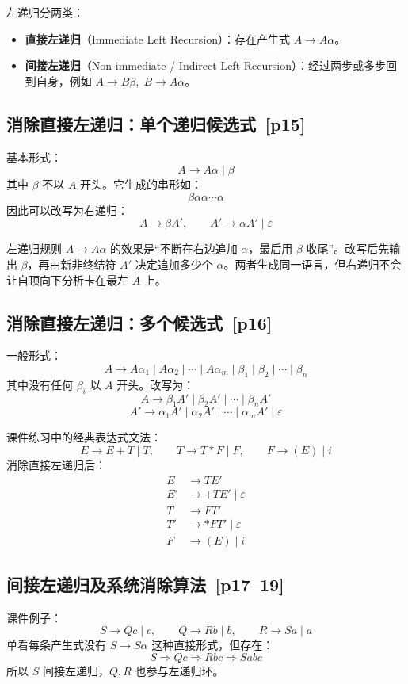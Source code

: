 \documentclass[UTF8,fontset=none,11pt]{ctexart}
\newenvironment{notebox}[1][]{%
  \par\medskip\noindent{\color{maincol}\rule{\linewidth}{1.1pt}}\par\nopagebreak
  \noindent{\bfseries\color{maincol}#1}\par\nopagebreak\smallskip}%
  {\par\nopagebreak\smallskip\noindent{\color{maincol}\rule{\linewidth}{0.4pt}}\par\medskip}
\newcommand{\pg}[1]{\texorpdfstring{{\small\color{graytext}\,[p#1]}}{ [p#1]}}
\newcommand{\term}[2]{\textbf{#1}（#2）}
\newcommand{\eps}{\varepsilon}
\begin{document}
左递归分两类：
\begin{itemize}
  \item \term{直接左递归}{Immediate Left Recursion}：存在产生式 \(A\to A\alpha\)。
  \item \term{间接左递归}{Non-immediate / Indirect Left Recursion}：经过两步或多步回到自身，例如 \(A\to B\beta,\;B\to A\alpha\)。
\end{itemize}

\subsection{消除直接左递归：单个递归候选式 \pg{15}}
基本形式：
\[
A\to A\alpha\mid\beta
\]
其中 \(\beta\) 不以 \(A\) 开头。它生成的串形如：
\[
\beta\alpha\alpha\cdots\alpha
\]
因此可以改写为右递归：
\[
A\to \beta A',\qquad A'\to \alpha A'\mid\eps
\]

\begin{notebox}[通俗理解]
左递归规则 \(A\to A\alpha\) 的效果是“不断在右边追加 \(\alpha\)，最后用 \(\beta\) 收尾”。改写后先输出 \(\beta\)，再由新非终结符 \(A'\) 决定追加多少个 \(\alpha\)。两者生成同一语言，但右递归不会让自顶向下分析卡在最左 \(A\) 上。
\end{notebox}

\subsection{消除直接左递归：多个候选式 \pg{16}}
一般形式：
\[
A\to A\alpha_1\mid A\alpha_2\mid\cdots\mid A\alpha_m
\mid \beta_1\mid\beta_2\mid\cdots\mid\beta_n
\]
其中没有任何 \(\beta_i\) 以 \(A\) 开头。改写为：
\[
A\to \beta_1A'\mid \beta_2A'\mid\cdots\mid\beta_nA'
\]
\[
A'\to \alpha_1A'\mid \alpha_2A'\mid\cdots\mid\alpha_mA'\mid\eps
\]

课件练习中的经典表达式文法：
\[
E\to E+T\mid T,\qquad T\to T*F\mid F,\qquad F\to(E)\mid i
\]
消除直接左递归后：
\[
\begin{aligned}
E&\to TE'\\
E'&\to +TE'\mid\eps\\
T&\to FT'\\
T'&\to *FT'\mid\eps\\
F&\to(E)\mid i
\end{aligned}
\]

\subsection{间接左递归及系统消除算法 \pg{17--19}}
课件例子：
\[
S\to Qc\mid c,\qquad Q\to Rb\mid b,\qquad R\to Sa\mid a
\]
单看每条产生式没有 \(S\to S\alpha\) 这种直接形式，但存在：
\[
S\Rightarrow Qc\Rightarrow Rbc\Rightarrow Sabc
\]
所以 \(S\) 间接左递归，\(Q,R\) 也参与左递归环。
\end{document}
